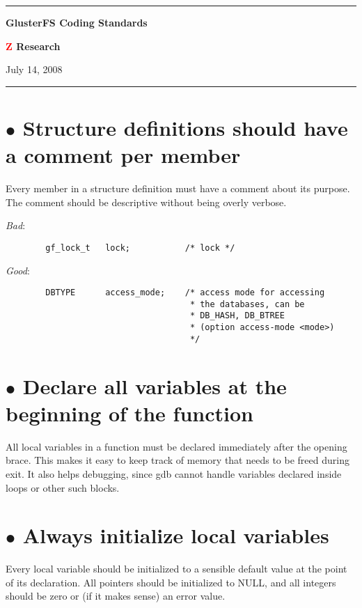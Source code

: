 \documentclass{article}[12pt]
\begin{document}
\hrule
\begin{center}\textbf{\Large{GlusterFS Coding Standards}}\end{center}
\begin{center}\textbf{\large{\textcolor{red}{Z} Research}}\end{center}
\begin{center}{July 14, 2008}\end{center}
\hrule

\vspace{8ex}

\section*{$\bullet$ Structure definitions should have a comment per member}

Every member in a structure definition must have a comment about its
purpose. The comment should be descriptive without being overly verbose.

\vspace{2ex}
\textsl{Bad}:

\begin{verbatim}
        gf_lock_t   lock;           /* lock */
\end{verbatim}

\textsl{Good}:

\begin{verbatim}
        DBTYPE      access_mode;    /* access mode for accessing 
                                     * the databases, can be
                                     * DB_HASH, DB_BTREE
                                     * (option access-mode <mode>)
                                     */
\end{verbatim}

\section*{$\bullet$ Declare all variables at the beginning of the function}
All local variables in a function must be declared immediately after the
opening brace. This makes it easy to keep track of memory that needs to be freed
during exit. It also helps debugging, since gdb cannot handle variables
declared inside loops or other such blocks.

\section*{$\bullet$ Always initialize local variables}
Every local variable should be initialized to a sensible default value
at the point of its declaration. All pointers should be initialized to NULL,
and all integers should be zero or (if it makes sense) an error value.
\end{document}
